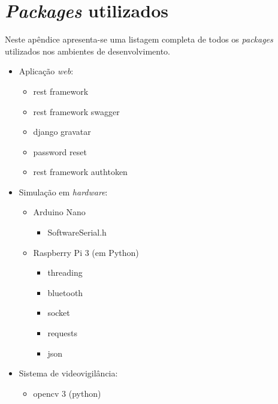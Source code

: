 \chapter{\textit{Packages} utilizados}
\label{espcifAPIREST}


Neste apêndice apresenta-se uma listagem completa de todos os \textit{packages} utilizados nos ambientes de desenvolvimento. 


\begin{itemize}
	\item Aplicação \textit{web}: 
	
			\begin{itemize}

				\item rest framework
				\item rest framework swagger
				\item django gravatar
				\item password reset
				\item rest framework authtoken

			\end{itemize}
			
	
	
	\item Simulação em \textit{hardware}: 
	\begin{itemize}
		\item Arduino Nano 
		
		\begin{itemize}
			\item SoftwareSerial.h
		\end{itemize}
		
		
		\item Raspberry Pi 3 (em Python)
		
		\begin{itemize}
			\item threading
			\item bluetooth
			\item socket
			\item requests
			\item json
		\end{itemize}
		
	\end{itemize}
	
	
	\item Sistema de videovigilância: 
	
	\begin{itemize}
			\item opencv 3 (python)
			
	\end{itemize}


	
\end{itemize}